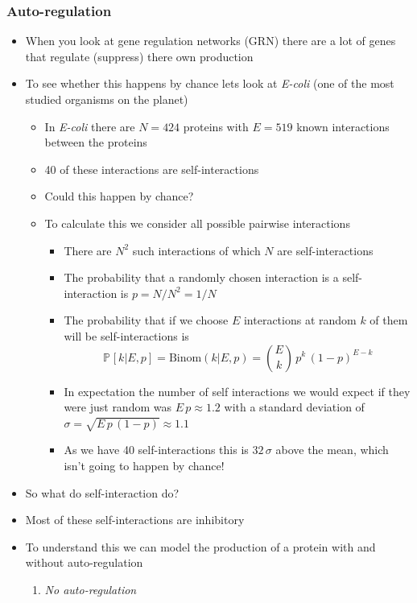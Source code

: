 \documentclass[11pt]{article}
\newcommand{\Prob}[2][]{\mathbb{P}_{#1\!}\left[ #2 \right]}
\begin{document}
\subsubsection{Auto-regulation}
\label{sec:orgf5c0fd5}
\begin{itemize}
\item When you look at gene regulation networks (GRN) there are a lot
of genes that regulate (suppress) there own production
\item To see whether this happens by chance lets look at \emph{E-coli} (one
of the most studied organisms on the planet)
\begin{itemize}
\item In \emph{E-coli} there are \(N=424\) proteins with \(E=519\) known interactions
between the proteins
\item 40 of these interactions are self-interactions
\item Could this happen by chance?
\item To calculate this we consider all possible pairwise interactions
\begin{itemize}
\item There are \(N^2\) such interactions of which \(N\) are self-interactions
\item The probability that a randomly chosen interaction is a
self-interaction is \(p=N/N^{2}=1/N\)
\item The probability that if we choose \(E\) interactions at random
\(k\) of them will be self-interactions is
\[  \Prob{k|E,p} = \mathrm{Binom}(k|E,p) =
         \binom{E}{k}\,p^k\,(1-p)^{E-k} \]
\item In expectation the number of self interactions we would expect
if they were just random was \(E\,p \approx 1.2\) with a
standard deviation of \(\sigma = \sqrt{E\,p\,(1-p)}\approx 1.1\)
\item As we have 40 self-interactions this is \(32\,\sigma\) above
the mean, which isn't going to happen by chance!
\end{itemize}
\end{itemize}
\item So what do self-interaction do?
\item Most of these self-interactions are inhibitory
\item To understand this we can model the production of a protein with
and without auto-regulation
\begin{enumerate}
\item \emph{No auto-regulation}
\begin{itemize}

\end{itemize}
\end{enumerate}
\end{itemize}
\end{document}
